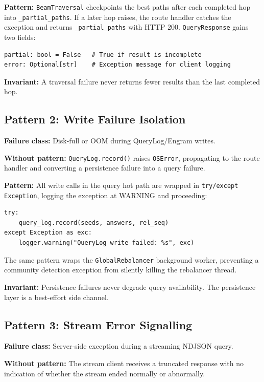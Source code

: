 \documentclass[10pt,twocolumn]{article}
\begin{document}
\textbf{Pattern:} \texttt{BeamTraversal} checkpoints the best paths after each completed
hop into \texttt{\_partial\_paths}. If a later hop raises, the route handler catches the
exception and returns \texttt{\_partial\_paths} with HTTP 200. \texttt{QueryResponse}
gains two fields:
\begin{lstlisting}
partial: bool = False   # True if result is incomplete
error: Optional[str]    # Exception message for client logging
\end{lstlisting}

\textbf{Invariant:} A traversal failure never returns fewer results than the last
completed hop.

\subsection{Pattern 2: Write Failure Isolation}

\textbf{Failure class:} Disk-full or OOM during QueryLog/Engram writes.

\textbf{Without pattern:} \texttt{QueryLog.record()} raises \texttt{OSError}, propagating
to the route handler and converting a persistence failure into a query failure.

\textbf{Pattern:} All write calls in the query hot path are wrapped in
\texttt{try/except Exception}, logging the exception at WARNING and proceeding:
\begin{lstlisting}
try:
    query_log.record(seeds, answers, rel_seq)
except Exception as exc:
    logger.warning("QueryLog write failed: %s", exc)
\end{lstlisting}

The same pattern wraps the \texttt{GlobalRebalancer} background worker, preventing
a community detection exception from silently killing the rebalancer thread.

\textbf{Invariant:} Persistence failures never degrade query availability. The persistence
layer is a best-effort side channel.

\subsection{Pattern 3: Stream Error Signalling}

\textbf{Failure class:} Server-side exception during a streaming NDJSON query.

\textbf{Without pattern:} The stream client receives a truncated response with no
indication of whether the stream ended normally or abnormally.
\end{document}
